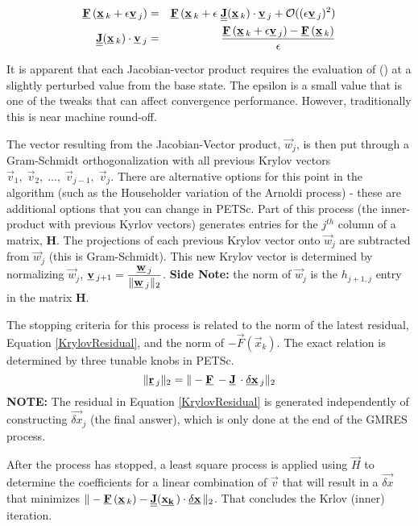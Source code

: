 \begin{eqnarray}
\label{JacobianFreeExpansion}
\Vec{F}(\Vec{x}_k + \epsilon \Vec{v}_j) & = & \Vec{F}(\Vec{x}_k + \epsilon \; \Mat{J}(\Vec{x}_k) \cdot \Vec{v}_j + \mathcal{O}((\epsilon \Vec{v}_j)^2) \\
\label{JacobianFreeApproximation}
\Mat{J} (\Vec{x}_k) \cdot \Vec{v}_j & = & \frac{\Vec{F}(\Vec{x}_k + \epsilon \Vec{v}_j) - \Vec{F}(\Vec{x}_k)}{\epsilon}
\end{eqnarray}

It is apparent that each Jacobian-vector product requires the evaluation of () at a slightly perturbed value from the base state. 
The epsilon is a small value that is one of the tweaks that can affect convergence performance.
However, traditionally this is near machine round-off.


The vector resulting from the Jacobian-Vector product, $\Vec{w}_j$, is then put through a Gram-Schmidt orthogonalization with all previous Krylov vectors $\Vec{v}_1,\;\Vec{v}_2,\;\dots,\;\Vec{v}_{j-1},\;\Vec{v}_j$.
There are alternative options for this point in the algorithm (such as the Householder variation of the Arnoldi process) - these are additional options that you can change in PETSc.
Part of this process (the inner-product with previous Kyrlov vectors) generates entries for the $j^{th}$ column of a matrix, \textbf{H}.
The projections of each previous Krylov vector onto $\Vec{w}_j$ are subtracted from $\Vec{w}_j$ (this is Gram-Schmidt). 
This new Krylov vector is determined by normalizing $\Vec{w}_j$, $\displaystyle \Vec{v}_{j+1} = \frac{\Vec{w}_j}{\norm{\Vec{w}_j}{2}}$.
\textbf{Side Note:} the norm of $\Vec{w}_j$ is the $h_{j+1,j}$ entry in the matrix $\mathbf{H}$.

The stopping criteria for this process is related to the norm of the latest residual, Equation \eqref{KrylovResidual}, and the norm of $-\Vec{F}(\Vec{x}_k)$.
The exact relation is determined by three tunable knobs in PETSc.
\begin{equation}
\label{KrylovResidual}
\norm{\Vec{r}_j}{2} = \norm{-\Vec{F}-\Vec{J}\cdot\Vec{\delta x}_j}{2}
\end{equation}
\textbf{NOTE:} The residual in Equation \eqref{KrylovResidual} is generated independently of constructing $\Vec{\delta x}_j$ (the final answer), which is only done at the end of the GMRES process.

After the process has stopped, a least square process is applied using $\Vec{H}$ to determine the coefficients for a linear combination of $\Vec{v}$ that will result in a $\Vec{\delta x}$ that minimizes $\norm{-\Vec{F}(\Vec{x}_k)-\Mat{J}(\Vec{x_k})\cdot\Vec{\delta x}}{2}$.
That concludes the Krlov (inner) iteration.

